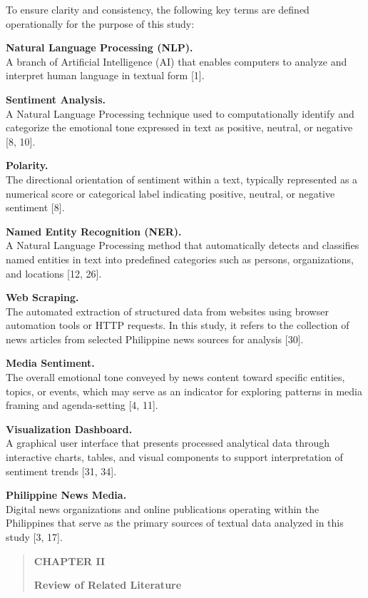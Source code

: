To ensure clarity and consistency, the following key terms are defined operationally for the purpose of this study:

\textbf{Natural Language Processing (NLP).}\\
A branch of Artificial Intelligence (AI) that enables computers to analyze and interpret human language in textual form {[}1{]}.

\textbf{Sentiment Analysis.}\\
A Natural Language Processing technique used to computationally identify and categorize the emotional tone expressed in text as positive, neutral, or negative {[}8, 10{]}.

\textbf{Polarity.}\\
The directional orientation of sentiment within a text, typically represented as a numerical score or categorical label indicating positive, neutral, or negative sentiment {[}8{]}.

\textbf{Named Entity Recognition (NER).}\\
A Natural Language Processing method that automatically detects and classifies named entities in text into predefined categories such as persons, organizations, and locations {[}12, 26{]}.

\textbf{Web Scraping.}\\
The automated extraction of structured data from websites using browser automation tools or HTTP requests. In this study, it refers to the collection of news articles from selected Philippine news sources for analysis {[}30{]}.

\textbf{Media Sentiment.}\\
The overall emotional tone conveyed by news content toward specific entities, topics, or events, which may serve as an indicator for exploring patterns in media framing and agenda-setting {[}4, 11{]}.

\textbf{Visualization Dashboard.}\\
A graphical user interface that presents processed analytical data through interactive charts, tables, and visual components to support interpretation of sentiment trends {[}31, 34{]}.

\textbf{Philippine News Media.}\\
Digital news organizations and online publications operating within the Philippines that serve as the primary sources of textual data analyzed in this study {[}3, 17{]}.

\begin{quote}
\textbf{CHAPTER II}

\textbf{Review of Related Literature}
\end{quote}

